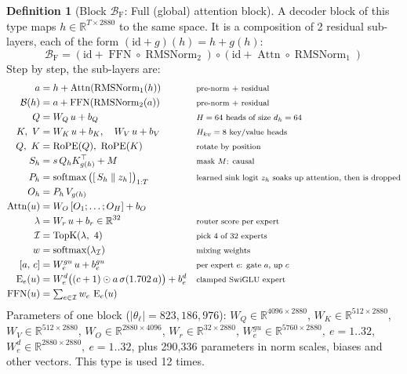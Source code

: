 \documentclass[10pt,a4paper]{article}
\newcommand{\op}[1]{\operatorname{#1}}
\theoremstyle{definition}
\newtheorem{definition}{Definition}[section]
\begin{document}
\begin{definition}[Block $\mathcal{B}_{\mathrm{F}}$: Full (global) attention block]
A decoder block of this type maps $h\in\mathbb{R}^{T\times 2880}$ to the same space. It is a composition of 2 residual sub-layers, each of the form $(\mathrm{id}+g)(h)=h+g(h)$:
\begin{equation}
  \mathcal{B}_{\mathrm{F}} = (\mathrm{id}+\op{FFN}\circ \op{RMSNorm}_{2})\circ(\mathrm{id}+\op{Attn}\circ \op{RMSNorm}_{1})
\end{equation}
Step by step, the sub-layers are:
\begin{align*}
  a &= h + \op{Attn}(\op{RMSNorm}_{1}(h)) && \text{\footnotesize pre-norm + residual} \\
  \mathcal{B}(h) &= a + \op{FFN}(\op{RMSNorm}_{2}(a)) && \text{\footnotesize pre-norm + residual} \\
  Q &= W_Q\,u + b_{Q} && \text{\footnotesize $H=64$ heads of size $d_h=64$} \\
  K,\ V &= W_K\,u + b_{K},\quad W_V\,u + b_{V} && \text{\footnotesize $H_{kv}=8$ key/value heads} \\
  Q,\ K &= \op{RoPE}(Q),\ \op{RoPE}(K) && \text{\footnotesize rotate by position} \\
  S_h &= s\, Q_h K_{g(h)}^{\top} + M && \text{\footnotesize mask $M$: causal} \\
  P_h &= \op{softmax}\big([\,S_h \;\|\; z_h\,]\big)_{1:T} && \text{\footnotesize learned sink logit $z_h$ soaks up attention, then is dropped} \\
  O_h &= P_h\, V_{g(h)} \\
  \op{Attn}(u) &= W_O\,[O_1;\dots;O_H] + b_O \\
  \lambda &= W_r\,u + b_r \in \mathbb{R}^{32} && \text{\footnotesize router score per expert} \\
  \mathcal{I} &= \op{TopK}(\lambda,\ 4) && \text{\footnotesize pick 4 of 32 experts} \\
  w &= \op{softmax}(\lambda_{\mathcal{I}}) && \text{\footnotesize mixing weights} \\
  [a,\,c] &= W^{gu}_e\,u + b^{gu}_e && \text{\footnotesize per expert $e$: gate $a$, up $c$} \\
  \op{E}_e(u) &= W^{d}_e\big((c+1)\odot a\,\sigma(1.702\,a)\big) + b^{d}_e && \text{\footnotesize clamped SwiGLU expert} \\
  \op{FFN}(u) &= \textstyle\sum_{e\in\mathcal{I}} w_e\,\op{E}_e(u)
\end{align*}
Parameters of one block ($|\theta_\ell|=823{,}186{,}976$): $W_Q\in\mathbb{R}^{4096\times2880}$, $W_K\in\mathbb{R}^{512\times2880}$, $W_V\in\mathbb{R}^{512\times2880}$, $W_O\in\mathbb{R}^{2880\times4096}$, $W_r\in\mathbb{R}^{32\times2880}$, $W^{gu}_e\in\mathbb{R}^{5760\times2880},\ e=1..{32}$, $W^{d}_e\in\mathbb{R}^{2880\times2880},\ e=1..{32}$, plus 290,336 parameters in norm scales, biases and other vectors. This type is used 12 times.
\end{definition}
\end{document}
